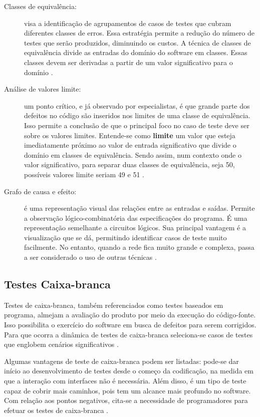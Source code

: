 \begin{description}
\item[Classes de equivalência:] visa a identificação de agrupamentos de casos de testes que cubram diferentes classes de erros. Essa estratégia permite a redução do número de testes que serão produzidos, diminuindo os custos. A técnica de classes de equivalência divide as entradas do domínio do software em classes. Essas classes devem ser derivadas a partir de um valor significativo para o domínio \cite{williams2006}.
\item[Análise de valores limite:] um ponto crítico, e já observado por especialistas, é que grande parte dos defeitos no código são inseridos nos limites de uma classe de equivalência. Isso permite a conclusão de que o principal foco no caso de teste deve ser sobre os valores limites. Entende-se como \textbf{limite} um valor que esteja imediatamente próximo ao valor de entrada significativo que divide o domínio em classes de equivalência. Sendo assim, num contexto onde o valor significativo, para separar duas classes de equivalência, seja 50, possíveis valores limite seriam 49 e 51 \cite{williams2006}.
\item[Grafo de causa e efeito:] é uma representação visual das relações entre as entradas e saídas. Permite a observação lógico-combinatória das especificações do programa. É uma representação semelhante a circuitos lógicos. Sua principal vantagem é a visualização que se dá, permitindo identificar casos de teste muito facilmente. No entanto, quando a rede fica muito grande e complexa, passa a ser considerado o uso de outras técnicas \cite{barbosaEtAl2009}.
\end{description}


\subsection{Testes Caixa-branca}
Testes de caixa-branca, também referenciados como testes baseados em programa, almejam a avaliação do produto por meio da execução do código-fonte. Isso possibilita o exercício do software em busca de defeitos para serem corrigidos. Para que ocorra a dinâmica de testes de caixa-branca seleciona-se casos de testes que englobem cenários significativos \cite{barbosaEtAl2009}.
\par
\indent Algumas vantagens de teste de caixa-branca podem ser listadas: pode-se dar início ao desenvolvimento de testes desde o começo da codificação, na medida em que a interação com interfaces não é necessária. Além disso, é um tipo de teste capaz de cobrir mais caminhos, pois tem um alcance mais profundo no software. Com relação aos pontos negativos, cita-se a necessidade de programadores para efetuar os testes de caixa-branca \cite{barbosaEtAl2009}.

